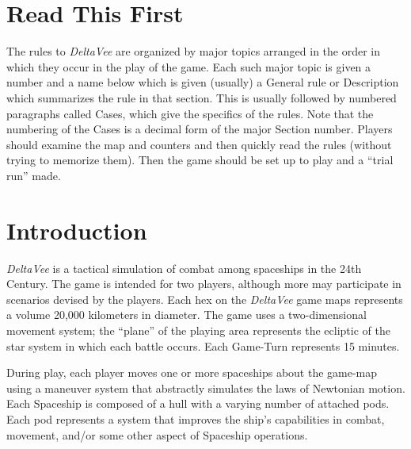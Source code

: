 



\section*{Read This First}
\label{sec:dv-read-this-first}


The rules to \emph{DeltaVee} are organized by major topics arranged in the
order in which they occur in the play of the game. Each such major
topic is given a number and a name below which is given (usually) a
General rule or Description which summarizes the rule in that section.
This is usually followed by numbered paragraphs called Cases, which
give the specifics of the rules. Note that the numbering of the Cases
is a decimal form of the major Section number. Players should examine
the map and counters and then quickly read the rules (without trying
to memorize them). Then the game should be set up to play and a
``trial run'' made.



\section{Introduction}
\label{sec:delta-vee-intro}



\emph{DeltaVee} is a tactical simulation of combat among spaceships
in the 24th Century. The game is intended for two players, although
more may participate in scenarios devised by the players. Each hex on
the \emph{DeltaVee} game maps represents a volume 20,000 kilometers
in diameter. The game uses a two-dimensional movement system; the
``plane'' of the playing area represents the ecliptic of the star
system in which each battle occurs. Each Game-Turn represents 15
minutes.

During play, each player moves one or more spaceships about the
game-map using a maneuver system that abstractly simulates the laws of
Newtonian motion. Each Spaceship is composed of a hull with a varying
number of attached pods. Each pod represents a system that improves
the ship's capabilities in combat, movement, and/or some other aspect
of Spaceship operations.

